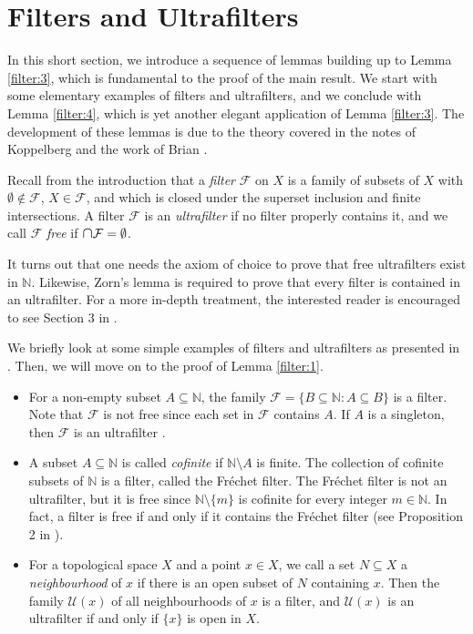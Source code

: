 \section{Filters and Ultrafilters}
In this short section, we introduce a sequence of lemmas building up to Lemma \ref{filter:3}, which is fundamental to the proof of the main result. We start with some elementary examples of filters and ultrafilters, and we conclude with Lemma \ref{filter:4}, which is yet another elegant application of Lemma \ref{filter:3}. The development of these lemmas is due to the theory covered in the notes of Koppelberg \cite{notes:2011} and the work of Brian \cite{brian:2016}.

Recall from the introduction that a \emph{filter} \( \mathcal{F} \) on \( X \) is a family of subsets of \( X \) with \( \emptyset \notin \mathcal{F} \), \( X \in \mathcal{F} \), and which is closed under the superset inclusion and finite intersections. A filter \( \mathcal{F} \) is an \emph{ultrafilter} if no filter properly contains it, and we call \( \mathcal{F} \) \emph{free} if \( \medcap \mathcal{F} = \emptyset \). 

It turns out that one needs the axiom of choice to prove that free ultrafilters exist in \( \mathbb{N} \). Likewise, Zorn's lemma is required to prove that every filter is contained in an ultrafilter. For a more in-depth treatment, the interested reader is encouraged to see Section 3 in \cite{notes:2018}.

We briefly look at some simple examples of filters and ultrafilters as presented in \cite{notes:2011}. Then, we will move on to the proof of Lemma \ref{filter:1}.


\begin{itemize}[leftmargin=0.8cm]
\item For a non-empty subset \( A \subseteq \mathbb{N} \), the family \( \mathcal{F} = \{ B \subseteq \mathbb{N} : A \subseteq B \} \) is a filter. Note that \( \mathcal{F} \) is not free since each set in \( \mathcal{F} \) contains \( A \). If \( A \) is a singleton, then \( \mathcal{F} \) is an ultrafilter \cite{notes:2018}.
\item A subset \( A \subseteq \mathbb{N} \) is called \emph{cofinite} if \( \mathbb{N} \setminus A \) is finite. The collection of cofinite subsets of \( \mathbb{N} \) is a filter, called the Fr\'echet filter. The Fr\'echet filter is not an ultrafilter, but it is free since \( \mathbb{N} \setminus \{ m \} \) is cofinite for every integer \( m \in \mathbb{N} \). In fact, a filter is free if and only if it contains the Fr\'echet filter (see Proposition 2 in \cite{notes:2015}).
\item For a topological space \( X \) and a point \( x \in X \), we call a set \( N \subseteq X \) a \emph{neighbourhood} of \( x \) if there is an open subset of \( N \) containing \( x \). Then the family \( \mathcal{U}(x) \) of all neighbourhoods of \( x \) is a filter, and \( \mathcal{U}(x) \) is an ultrafilter if and only if \( \{ x \} \) is open in \( X \).
\end{itemize}

